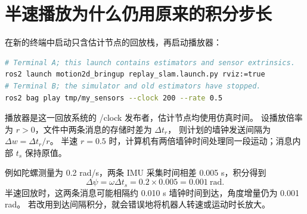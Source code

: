 \section{半速播放为什么仍用原来的积分步长}
在新的终端中启动只含估计节点的回放栈，再启动播放器：
\begin{lstlisting}[language=bash,numbers=none]
# Terminal A; this launch contains estimators and sensor extrinsics.
ros2 launch motion2d_bringup replay_slam.launch.py rviz:=true
# Terminal B; the simulator and old estimators have stopped.
ros2 bag play tmp/my_sensors --clock 200 --rate 0.5
\end{lstlisting}
播放器是这一回放系统的 /clock 发布者，估计节点均使用仿真时间。
设播放倍率为 $r>0$，文件中两条消息的存储时差为 $\Delta t_r$，
则计划的墙钟发送间隔为 $\Delta w=\Delta t_r/r$。
半速 $r=0.5$ 时，计算机有两倍墙钟时间处理同一段运动；消息内部 $t_s$ 保持原值。

例如陀螺测量为 0.2 rad/s，两条 IMU 采集时间相差 0.005 s，积分得到
\[
 \Delta\psi=\omega\Delta t_s=0.2\times0.005=0.001\ \mathrm{rad}.
\]
半速回放时，这两条消息可能相隔约 0.010 s 墙钟时间到达，角度增量仍为 0.001 rad。
若改用到达间隔积分，就会错误地将机器人转速或运动时长放大。

\begin{center}\begin{minipage}{\linewidth}\makeatletter{}\makeatother
\centering
{}
\caption{半速播放的时间对照。为突出比例，图中假设存储时差等于采集时差；实际回放发送顺序由文件时间决定。}
\end{minipage}\end{center}

